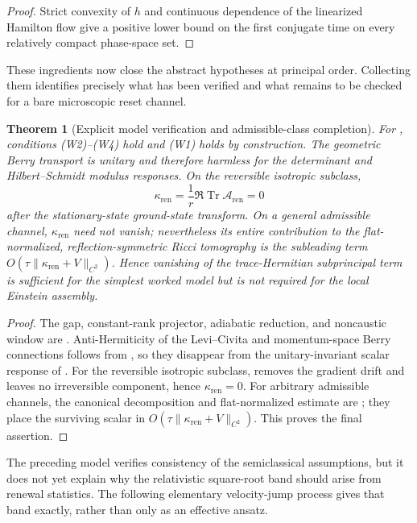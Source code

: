 \documentclass[11pt]{article}
\newtheorem{theorem}{Theorem}[section]
\theoremstyle{definition}
\theoremstyle{remark}
\newcommand{\Tr}{\operatorname{Tr}}
\newcommand{\ren}{\mathrm{ren}}
\newcommand{\kren}{\kappa_{\ren}}
\begin{document}
\begin{proof}
Strict convexity of $h$ and continuous dependence of the linearized Hamilton
flow give a positive lower bound on the first conjugate time on every relatively
compact phase-space set.
\end{proof}

These ingredients now close the abstract hypotheses at principal order.
Collecting them identifies precisely what has been verified and what remains to
be checked for a bare microscopic reset channel.

\begin{theorem}[Explicit model verification and admissible-class completion]
\label{thm:model-verifies}
For , conditions \textup{(W2)--(W4)} hold and
\textup{(W1)} holds by construction.  The geometric Berry transport is unitary
and therefore harmless for the determinant and Hilbert--Schmidt modulus
responses.  On the reversible isotropic subclass,
\[
  \kren=\frac1r\Re\Tr\mathcal A_{\ren}=0
\]
after the stationary-state ground-state transform.  On a general admissible
channel, \(\kren\) need not vanish; nevertheless its entire contribution to the
flat-normalized, reflection-symmetric Ricci tomography is the subleading term
\(O(\tau\|\kren+V\|_{C^2})\).  Hence vanishing of the trace-Hermitian
subprincipal term is sufficient for the simplest worked model but is not
required for the local Einstein assembly.
\end{theorem}

\begin{proof}
The gap, constant-rank projector, adiabatic reduction, and noncaustic window are
.  Anti-Hermiticity of the
Levi--Civita and momentum-space Berry connections follows from
, so they disappear from the
unitary-invariant scalar response of .  For the
reversible isotropic subclass,  removes the
gradient drift and leaves no irreversible component, hence \(\kren=0\).
For arbitrary admissible channels, the canonical decomposition and
flat-normalized estimate are
;
they place the surviving scalar in
\(O(\tau\|\kren+V\|_{C^2})\).  This proves the final assertion.
\end{proof}



The preceding model verifies consistency of the semiclassical assumptions,
but it does not yet explain why the relativistic square-root band should arise
from renewal statistics. The following elementary velocity-jump process gives
that band exactly, rather than only as an effective ansatz.
\end{document}

